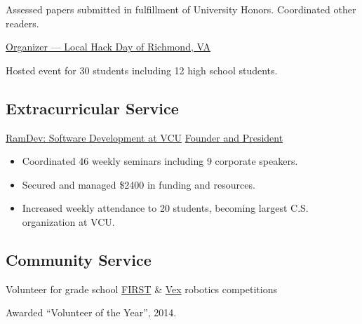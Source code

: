 \documentclass[11pt,letterpaper,serif]{moderncv}
\begin{document}
{
	\begin{adjustwidth}{.25in}{}
		Assessed papers submitted in fulfillment of University Honors. Coordinated other readers.
	\end{adjustwidth}
}




{\href{https://localhackday.mlh.io/}{Organizer --- Local Hack Day of Richmond, VA}}
{}{}
{
	\begin{adjustwidth}{.25in}{}
		Hosted event for 30 students including 12 high school students.
	\end{adjustwidth}
}

\subsection{Extracurricular Service}
{\href{https://vcuramdev.github.io/}{RamDev: Software Development at VCU}}
{\href{https://vcuramdev.github.io/}{Founder and President}}
{}{}
{
	\begin{adjustwidth}{.25in}{}
		\begin{itemize}
			\item Coordinated 46 weekly seminars including 9 corporate speakers.
			\item Secured and managed \$2400 in funding and resources.
			\item Increased weekly attendance to 20 students, becoming largest C.S. organization at VCU.
		\end{itemize}
	\end{adjustwidth}
}

\subsection{Community Service}
{Volunteer for grade school \textup{\href{https://www.firstinspires.org/robotics/ftc}{FIRST} \& \href{https://www.vexrobotics.com/vexedr/competition}{Vex}} robotics competitions}
{}{}
{
	\begin{adjustwidth}{.25in}{}
		Awarded ``Volunteer of the Year'', 2014.
	\end{adjustwidth}
}
\end{document}
